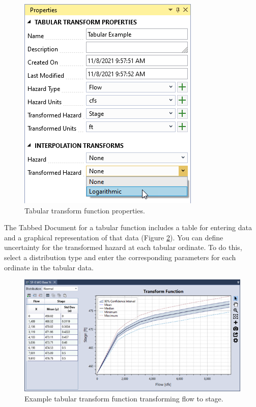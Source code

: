 \documentclass[
]{book}
\begin{document}
\begin{figure}

{\centering \includegraphics{images/figure81} 

}

\caption{Tabular transform function properties.}\label{fig:figure-81}
\end{figure}

The Tabbed Document for a tabular function includes a table for entering data and a graphical representation of that data (Figure \ref{fig:figure-82}). You can define uncertainty for the transformed hazard at each tabular ordinate. To do this, select a distribution type and enter the corresponding parameters for each ordinate in the tabular data.

\begin{figure}

{\centering \includegraphics{images/figure82} 

}

\caption{Example tabular transform function transforming flow to stage.}\label{fig:figure-82}
\end{figure}
\end{document}
